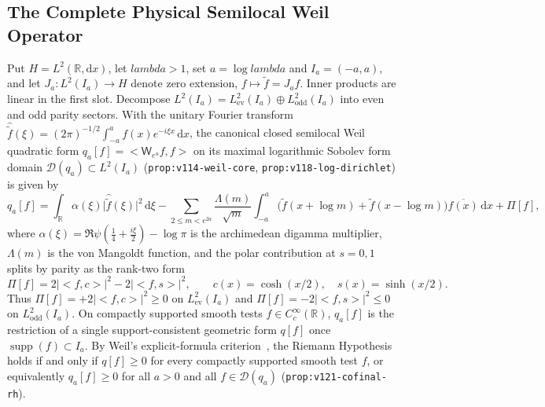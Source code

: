 \documentclass[11pt]{article}
\def\lambda{lambda}%
\def\ip#1#2{<#1,#2>}%
\theoremstyle{remark}
\newcommand{\ip}[2]{\left\langle #1,#2\right\rangle}
\newcommand{\dd}{\mathrm d}
\begin{document}
\subsection{The Complete Physical Semilocal Weil Operator}
Put $H = L^2(\mathbb{R},\dd x)$, let $\lambda > 1$, set $a = \log\lambda$ and $I_a = (-a,a)$, and let $J_a : L^2(I_a) \to H$ denote zero extension, $f \mapsto \widetilde{f} = J_a f$. Inner products are linear in the first slot. Decompose $L^2(I_a) = L^2_{\mathrm{ev}}(I_a) \oplus L^2_{\mathrm{odd}}(I_a)$ into even and odd parity sectors. With the unitary Fourier transform $\widehat{\widetilde{f}}(\xi) = (2\pi)^{-1/2}\int_{-a}^a f(x)e^{-i\xi x}\,\dd x$, the canonical closed semilocal Weil quadratic form $q_a[f] = \ip{\mathsf{W}_{e^a}f}{f}$ on its maximal logarithmic Sobolev form domain $\mathcal{D}(q_a) \subset L^2(I_a)$ (\texttt{prop:v114-weil-core}, \texttt{prop:v118-log-dirichlet}) is given by
\begin{equation}\label{eq:weil-form}
  q_a[f] = \int_{\mathbb{R}} \alpha(\xi)\bigl|\widehat{\widetilde{f}}(\xi)\bigr|^2\,\dd\xi - \sum_{2 \le m < e^{2a}} \frac{\Lambda(m)}{\sqrt{m}} \int_{-a}^a \bigl(\widetilde{f}(x + \log m) + \widetilde{f}(x - \log m)\bigr)\overline{f(x)}\,\dd x + \Pi[f],
\end{equation}
where $\alpha(\xi) = \Re\psi\!\left(\tfrac{1}{4} + \tfrac{i\xi}{2}\right) - \log\pi$ is the archimedean digamma multiplier, $\Lambda(m)$ is the von Mangoldt function, and the polar contribution at $s = 0, 1$ splits by parity as the rank-two form
\begin{equation}\label{eq:pole-form}
  \Pi[f] = 2\bigl|\ip{f}{c}\bigr|^2 - 2\bigl|\ip{f}{s}\bigr|^2, \qquad c(x) = \cosh(x/2), \quad s(x) = \sinh(x/2).
\end{equation}
Thus $\Pi[f] = +2|\ip{f}{c}|^2 \ge 0$ on $L^2_{\mathrm{ev}}(I_a)$ and $\Pi[f] = -2|\ip{f}{s}|^2 \le 0$ on $L^2_{\mathrm{odd}}(I_a)$. On compactly supported smooth tests $f \in C_c^\infty(\mathbb{R})$, $q_a[f]$ is the restriction of a single support-consistent geometric form $q[f]$ once $\operatorname{supp}(f) \subset I_a$. By Weil's explicit-formula criterion~\cite{BurnolExplicit2000,ConnesConsani2023,ConnesConsaniMoscovici2025}, the Riemann Hypothesis holds if and only if $q[f] \ge 0$ for every compactly supported smooth test $f$, or equivalently $q_a[f] \ge 0$ for all $a > 0$ and all $f \in \mathcal{D}(q_a)$ (\texttt{prop:v121-cofinal-rh}).
\end{document}
